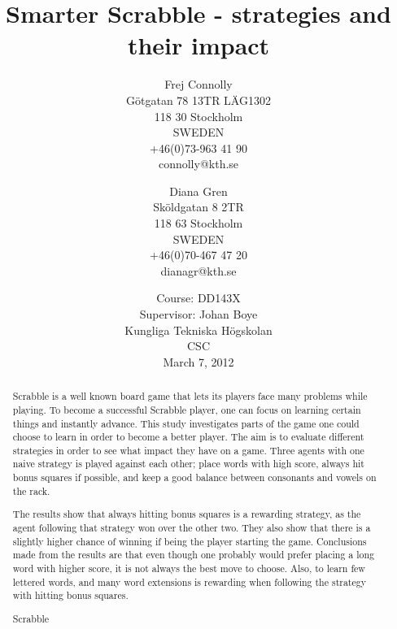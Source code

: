 \documentclass[a4paper, 12pt]{report}
\begin{document}
\graphicspath{{./images/}}
\title{Smarter Scrabble - strategies and their impact}
\date{Course: DD143X \\ Supervisor: Johan Boye \\ Kungliga Tekniska Högskolan \\ CSC \\ March 7, 2012}
\author{Frej Connolly \\ Götgatan 78 13TR LÄG1302 \\ 118 30 Stockholm \\ SWEDEN \\ +46(0)73-963 41 90 \\ connolly@kth.se \\
        \and Diana Gren \\ Sköldgatan 8 2TR \\ 118 63 Stockholm \\ SWEDEN \\ +46(0)70-467 47 20 \\ dianagr@kth.se}

\maketitle
\begin{abstract}
Scrabble is a well known board game that lets its players face many problems while playing. To become a successful Scrabble player, one can focus on learning certain things and instantly advance. This study investigates parts of the game one could choose to learn in order to become a better player. The aim is to evaluate different strategies in order to see what impact they have on a game. Three agents with one naive strategy is played against each other; place words with high score, always hit bonus squares if possible, and keep a good balance between consonants and vowels on the rack. 

The results show that always hitting bonus squares is a rewarding strategy, as the agent following that strategy won over the other two. They also show that there is a slightly higher chance of winning if being the player starting the game. Conclusions made from the results are that even though one probably would prefer placing a long word with higher score, it is not always the best move to choose. Also, to learn few lettered words, and many word extensions is rewarding when following the strategy with hitting bonus squares.
\end{abstract}

\begin{abstract}
Scrabble 
\end{abstract}
\end{document}
